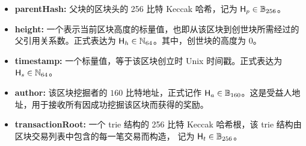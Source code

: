 \begin{itemize}[nosep]
	\item {\bf parentHash:} 父块的区块头的 256 比特 Keccak 哈希，记为
	$\textsf{H}_p\in\mathbb{B}_{256}$。
	
	\item {\bf height:} 一个表示当前区块高度的标量值，也即从该区块到创世块所需经过的父引用关系数。正式表达为 $\textsf{H}_h\in \mathbb{N}_{64}$。其中，创世块的高度为 $0$。
	
	\item {\bf timestamp:} 一个标量值，等于该区块创立时 Unix 时间戳。正式表达为 $\textsf{H}_s \in \mathbb{N}_{64}$。

	\item {\bf author:} 该区块挖掘者的 $160$ 比特地址，正式记作 $\textsf{H}_a \in \mathbb{B}_{160}$。这是受益人地址，用于接收所有因成功挖掘该区块而获得的奖励。

	\item {\bf transactionRoot:} 一个 trie 结构的 256 比特 Keccak 哈希根，该 trie 结构由区块交易列表中包含的每一笔交易而构造， 记为 $\textsf{H}_t\in\mathbb{B}_{256}$。


\end{itemize}
